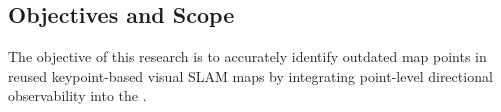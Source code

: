 \subsection{Objectives and Scope}
\label{objectives}

The objective of this research is to accurately identify outdated map points in reused keypoint-based visual SLAM maps by integrating point-level directional observability into the . 